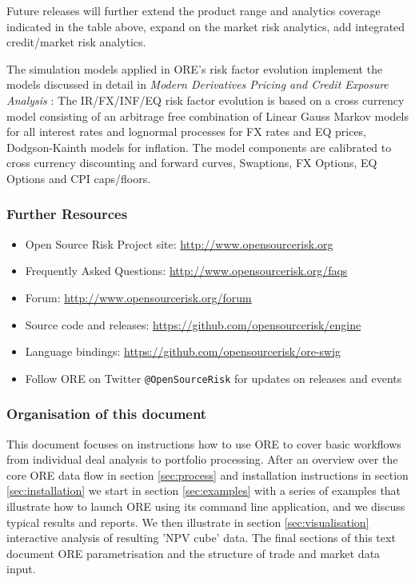 \documentclass[12pt, a4paper]{article}
\begin{document}
Future releases will further extend the product range and analytics coverage indicated in the table above, expand on the market risk analytics, add integrated credit/market risk analytics. 

\medskip The simulation models applied in ORE's risk factor evolution implement the models discussed in detail in {\em
  Modern Derivatives Pricing and Credit Exposure Analysis} \cite{Lichters}: The IR/FX/INF/EQ risk factor evolution is based on
a cross currency model consisting of an arbitrage free combination of Linear Gauss Markov models for all interest rates
and lognormal processes for FX rates and EQ prices, Dodgson-Kainth models for inflation. The model components are calibrated to cross currency discounting and forward curves, Swaptions, FX Options, EQ Options and CPI caps/floors.

\subsubsection*{Further Resources}
\begin{itemize}
\item Open Source Risk Project site: \url{http://www.opensourcerisk.org}
\item Frequently Asked Questions: \url{http://www.opensourcerisk.org/faqs}
\item Forum: \url{http://www.opensourcerisk.org/forum}
\item Source code and releases: \url{https://github.com/opensourcerisk/engine}
\item Language bindings: \url{https://github.com/opensourcerisk/ore-swig}
\item Follow ORE on Twitter {\tt @OpenSourceRisk} for updates on releases and events
\end{itemize}
 
\subsubsection*{Organisation of this document}

This document focuses on instructions how to use ORE to cover basic workflows from individual deal analysis to portfolio
processing. After an overview over the core ORE data flow in section \ref{sec:process} and installation instructions in
section \ref{sec:installation} we start in section \ref{sec:examples} with a series of examples that illustrate how to
launch ORE using its command line application, and we discuss typical results and reports. We then illustrate in section
\ref{sec:visualisation} interactive analysis of resulting 'NPV cube' data. The final sections of this text document ORE
parametrisation and the structure of trade and market data input.
\end{document}

